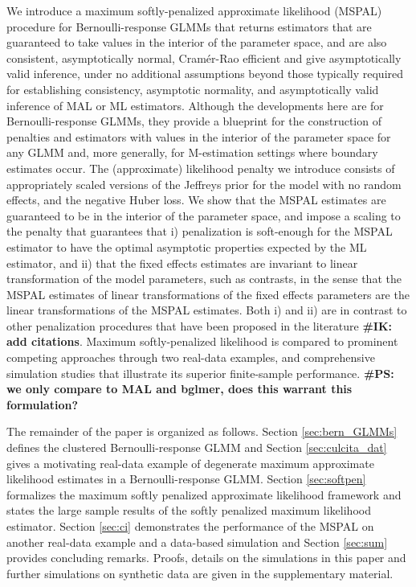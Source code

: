 \documentclass[11pt, a4paper]{article}
\newcommand{\IK}[1]{{\noindent \color{blue} \bf \#IK: #1}}
\newcommand{\PS}[1]{{\noindent \color{red} \bf \#PS: #1}}
\theoremstyle{example} \newtheorem{example}{Example}[section]
\theoremstyle{theorem} \newtheorem{theorem}{Theorem}[section]
\begin{document}
We introduce a maximum softly-penalized approximate likelihood (MSPAL)
procedure for Bernoulli-response GLMMs that returns estimators that
are guaranteed to take values in the interior of the parameter space,
and are also consistent, asymptotically normal, Cram\'{e}r-Rao
efficient and give asymptotically valid inference, under no additional assumptions beyond those typically
required for establishing consistency, asymptotic normality, and asymptotically valid inference of MAL
or ML estimators. Although the developments here are for
Bernoulli-response GLMMs, they provide a blueprint for the
construction of penalties and estimators with values in the interior
of the parameter space for any GLMM and, more generally, for
M-estimation settings where boundary estimates occur. The
(approximate) likelihood penalty we introduce consists of
appropriately scaled versions of the Jeffreys prior for the model with
no random effects, and the negative Huber loss. We show that the MSPAL
estimates are guaranteed to be in the interior of the parameter space,
and impose a scaling to the penalty
that guarantees that i) penalization is soft-enough for the MSPAL
estimator to have the optimal asymptotic properties expected by the ML
estimator, and ii) that the fixed effects estimates are invariant to linear
transformation of the model parameters, such as contrasts, in the
sense that the MSPAL estimates of linear transformations of the fixed
effects parameters are the linear transformations of the MSPAL
estimates. Both i) and ii) are in contrast to other penalization
procedures that have been proposed in the literature \citep[see, for
example,][]{chung+etal:2013, chung+etal:2015} \IK{add citations}. Maximum
softly-penalized likelihood is compared to prominent competing
approaches through two real-data examples, and comprehensive
simulation studies that illustrate its superior finite-sample
performance. \PS{we only compare to MAL and bglmer, does this warrant this formulation?}

The remainder of the paper is organized as follows. Section \ref{sec:bern_GLMMs} defines the clustered
Bernoulli-response GLMM and Section \ref{sec:culcita_dat} gives a motivating real-data example of
degenerate maximum approximate likelihood estimates in a Bernoulli-response GLMM. Section
\ref{sec:softpen} formalizes the maximum softly penalized approximate likelihood framework and
states the large sample results of the softly penalized maximum
likelihood estimator. Section \ref{sec:ci} demonstrates the performance of the MSPAL on another real-data example and a data-based simulation and Section \ref{sec:sum} provides concluding remarks. Proofs, details on the simulations in this paper and further simulations on synthetic data are given in the supplementary material. 
\end{document}
